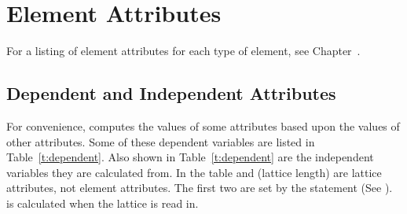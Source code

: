 \chapter {Element Attributes}
\label{c:attrib}

For a listing of element attributes for each type of element, see Chapter~.

\section{Dependent and Independent Attributes} 
\label{s:depend} 

For convenience, \bmad computes the values of some attributes based
upon the values of other attributes. Some of these dependent variables are
listed in Table~\ref{t:dependent}. Also shown in
Table~\ref{t:dependent} are the independent variables they are
calculated from.  In the table  and  (lattice
length) are lattice attributes, not element attributes. The first two
are set by the  statement (See
).  is calculated when the lattice is read
in.

